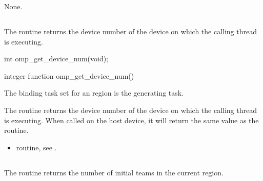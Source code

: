 \crossreferences
None.











\subsection{}
\label{subsec:omp_get_device_num}
\summary
The  routine returns the device number of the device on which
the calling thread is executing.

\format
\begin{ccppspecific}
\begin{boxedcode}
int omp\_get\_device\_num(void);
\end{boxedcode}
\end{ccppspecific}

\begin{fortranspecific}
\begin{boxedcode}
integer function omp\_get\_device\_num()
\end{boxedcode}
\end{fortranspecific}

\binding
The binding task set for an  region is the generating task.

\effect
The  routine returns the device number of the device on which
the calling thread is executing. When called on the host device, it will return the same
value as the  routine.

\crossreferences
\begin{itemize}
\item {} routine, see
.
\end{itemize}










\subsection{}
\label{subsec:omp_get_num_teams}
\summary
The  routine returns the number of initial teams in the current  
region.

